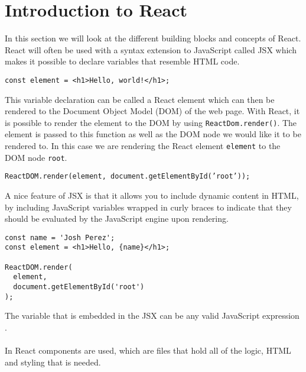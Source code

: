 \section{Introduction to React}\label{sec:intro-to-react}
In this section we will look at the different building blocks and concepts of React.
React will often be used with a syntax extension to JavaScript called JSX \cite{introducingJSX} which makes it possible to declare variables that resemble HTML code.

\begin{center}
    \texttt{const element = <h1>Hello, world!</h1>;}
\end{center}
This variable declaration can be called a React element which can then be rendered to the Document Object Model (DOM) of the web page.
With React, it is possible to render the element to the DOM by using \texttt{ReactDom.render()}.
The element is passed to this function as well as the DOM node we would like it to be rendered to.
In this case we are rendering the React element \texttt{element} to the DOM node \texttt{root}.

\begin{center}
    \texttt{ReactDOM.render(element, document.getElementById('root'));}
\end{center}
A nice feature of JSX is that it allows you to include dynamic content in HTML, by including JavaScript variables wrapped in curly braces to indicate that they should be evaluated by the JavaScript engine upon rendering.

\begin{lstlisting}
const name = 'Josh Perez';
const element = <h1>Hello, {name}</h1>;

ReactDOM.render(
  element,
  document.getElementById('root')
);
\end{lstlisting}
The variable that is embedded in the JSX can be any valid JavaScript expression \cite{introducingJSX}.
\\\\
In React components are used, which are files that hold all of the logic, HTML and styling that is needed.


